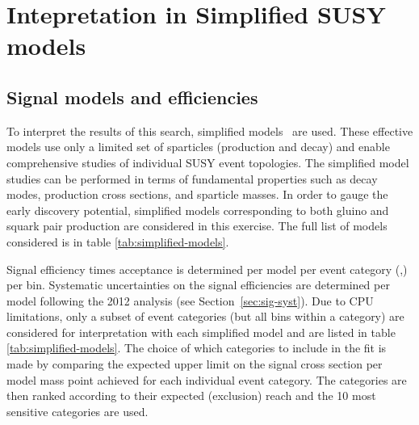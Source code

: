 \section{Intepretation in Simplified SUSY models}
\label{sec:susy}

\subsection{Signal models and efficiencies}
\label{subsec:susy_models}
To interpret the results of this search, simplified
models~\cite{Alwall:2008ag,Alwall:2008va,sms} are used. These
effective models use only a limited set of sparticles (production and
decay) and enable comprehensive studies of individual SUSY event
topologies. The simplified model studies can be performed in terms of
fundamental properties such as decay modes, production cross sections,
and sparticle masses. 
In order to gauge the early discovery potential, simplified models corresponding to both gluino and squark pair production 
are considered in this exercise. The full list of models considered is in table \ref{tab:simplified-models}. 

Signal efficiency times acceptance is determined per model per event
category (\njet,\nb) per \scalht bin. Systematic
uncertainties on the signal efficiencies are determined per model
following the 2012 analysis (see Section~\ref{sec:sig-syst}). Due to CPU
limitations, only a subset of event categories (but all \scalht bins
within a category) are considered for interpretation with each
simplified model and are listed in table \ref{tab:simplified-models}. 
The choice of which categories to include in the fit 
is made by comparing the expected upper limit on the signal cross section 
per model mass point achieved for each individual event category. 
The categories are then ranked according to their expected (exclusion) reach 
and the 10 most sensitive categories are used. 

